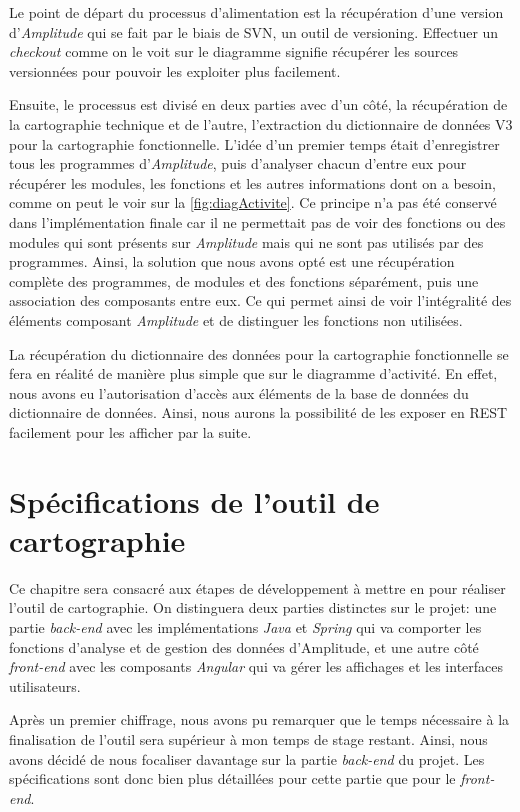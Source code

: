 \documentclass{polytech/polytech}
\begin{document}
Le point de départ du processus d'alimentation est la récupération d'une version d'\textit{Amplitude} qui se fait par le biais de SVN, un outil de versioning. Effectuer un \textit{checkout} comme on le voit sur le diagramme signifie récupérer les sources versionnées pour pouvoir les exploiter plus facilement.

Ensuite, le processus est divisé en deux parties avec d'un côté, la récupération de la cartographie technique et de l'autre, l'extraction du dictionnaire de données V3 pour la cartographie fonctionnelle. L'idée d'un premier temps était d'enregistrer tous les programmes d'\textit{Amplitude}, puis d'analyser chacun d'entre eux pour récupérer les modules, les fonctions et les autres informations dont on a besoin, comme on peut le voir sur la \autoref{fig:diagActivite}. Ce principe n'a pas été conservé dans l'implémentation finale car il ne permettait pas de voir des fonctions ou des modules qui sont présents sur \textit{Amplitude} mais qui ne sont pas utilisés par des programmes. Ainsi, la solution que nous avons opté est une récupération complète des programmes, de modules et des fonctions séparément, puis une association des composants entre eux. Ce qui permet ainsi de voir l'intégralité des éléments composant \textit{Amplitude} et de distinguer les fonctions non utilisées. 

La récupération du dictionnaire des données pour la cartographie fonctionnelle se fera en réalité de manière plus simple que sur le diagramme d'activité. En effet, nous avons eu l'autorisation d'accès aux éléments de la base de données du dictionnaire de données. Ainsi, nous aurons la possibilité de les exposer en REST facilement pour les afficher par la suite. 

\chapter{Spécifications de l'outil de cartographie}

Ce chapitre sera consacré aux étapes de développement à mettre en pour réaliser l’outil de cartographie. On distinguera deux parties distinctes sur le projet: une partie \textit{back-end} avec les implémentations \textit{Java} et \textit{Spring} qui va comporter les fonctions d’analyse et de gestion des données d’Amplitude, et une autre côté \textit{front-end} avec les composants \textit{Angular} qui va gérer les affichages et les interfaces utilisateurs.

Après un premier chiffrage, nous avons pu remarquer que le temps nécessaire à la finalisation de l'outil sera supérieur à mon temps de stage restant. Ainsi, nous avons décidé de nous focaliser davantage sur la partie \textit{back-end} du projet. Les spécifications sont donc bien plus détaillées pour cette partie que pour le \textit{front-end}.
\end{document}
